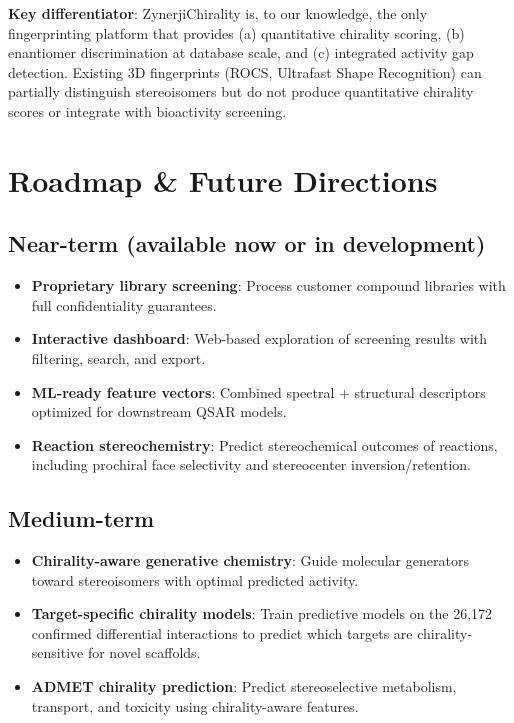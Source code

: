 \documentclass[11pt,a4paper]{article}
\begin{document}
\textbf{Key differentiator}: ZynerjiChirality is, to our knowledge, the only
fingerprinting platform that provides (a) quantitative chirality scoring,
(b) enantiomer discrimination at database scale, and (c) integrated activity gap
detection. Existing 3D fingerprints (ROCS, Ultrafast Shape Recognition) can
partially distinguish stereoisomers but do not produce quantitative chirality
scores or integrate with bioactivity screening.

\newpage

\section{Roadmap \& Future Directions}

\subsection{Near-term (available now or in development)}

\begin{itemize}[leftmargin=1.5em]
  \item \textbf{Proprietary library screening}: Process customer compound
    libraries with full confidentiality guarantees.
  \item \textbf{Interactive dashboard}: Web-based exploration of screening
    results with filtering, search, and export.
  \item \textbf{ML-ready feature vectors}: Combined spectral + structural
    descriptors optimized for downstream QSAR models.
  \item \textbf{Reaction stereochemistry}: Predict stereochemical outcomes of
    reactions, including prochiral face selectivity and stereocenter
    inversion/retention.
\end{itemize}

\subsection{Medium-term}

\begin{itemize}[leftmargin=1.5em]
  \item \textbf{Chirality-aware generative chemistry}: Guide molecular
    generators toward stereoisomers with optimal predicted activity.
  \item \textbf{Target-specific chirality models}: Train predictive models
    on the 26,172 confirmed differential interactions to predict which
    targets are chirality-sensitive for novel scaffolds.
  \item \textbf{ADMET chirality prediction}: Predict stereoselective
    metabolism, transport, and toxicity using chirality-aware features.
\end{itemize}
\end{document}
